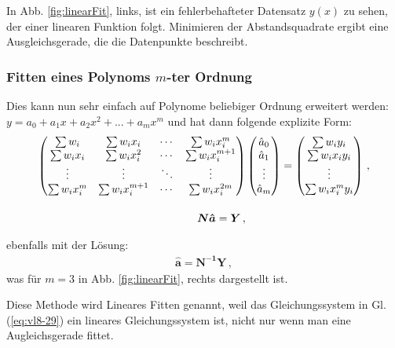 In Abb. \ref{fig:linearFit}, links, ist ein fehlerbehafteter Datensatz $y(x)$ zu sehen, der einer linearen Funktion folgt. 
Minimieren der Abstandsquadrate ergibt eine Ausgleichsgerade, die die Datenpunkte beschreibt. 

\subsubsection{Fitten eines Polynoms \texorpdfstring{$m$}{m}-ter Ordnung}
\label{subsubsec:vl8-2}

Dies kann nun sehr einfach auf Polynome beliebiger Ordnung erweitert werden: $y = a_0 + a_1 x + a_2 x^2 + ... + a_m x^m$ und hat dann folgende explizite Form:
\begin{align}
\begin{pmatrix}
\sum w_i       & \sum w_i x_i       & \cdots & \sum w_i x_i^m     \\
\sum w_i x_i   & \sum w_i x_i^2     & \cdots & \sum w_i x_i^{m+1} \\
\vdots         & \vdots             & \ddots & \vdots             \\
\sum w_i x_i^m & \sum w_i x_i^{m+1} & \cdots & \sum w_i x_i^{2m}  
\end{pmatrix}
&
\begin{pmatrix}
\hat{a}_0 \\
\hat{a}_1 \\
\vdots    \\
\hat{a}_m
\end{pmatrix}
= 
\begin{pmatrix}
\sum w_i y_i       \\
\sum w_i x_i y_i   \\
\vdots             \\
\sum w_i x_i^m y_i
\end{pmatrix}\,,\\
\intertext{}
\boldsymbol{N \hat{a}} = \boldsymbol{Y}\,,
\label{eq:vl8-29}
\end{align}

ebenfalls mit der L\"osung:
\begin{align}
\boldsymbol{\hat{a}} = \boldsymbol{N^{-1} Y}\, ,    
\label{eq:vl8-29-2}
\end{align}
was für $m=3$ in Abb. \ref{fig:linearFit}, rechts dargestellt ist. 


\begin{center}
\begin{tcolorbox}[enhanced,width=6in,drop fuzzy shadow southwest,
    colframe=red!50!black,colback=red!05]
   Diese Methode wird Lineares Fitten genannt, weil das Gleichungssystem in Gl. (\ref{eq:vl8-29}) ein lineares Gleichungssystem ist, nicht nur wenn man eine Augleichsgerade fittet. 
\end{tcolorbox}
\end{center}

